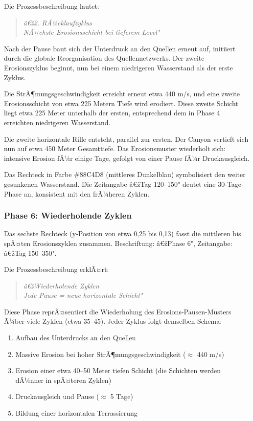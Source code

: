 Die Prozessbeschreibung lautet:
\begin{quote}
\textit{â€ž2. RÃ¼cklaufzyklus\\
NÃ¤chste Erosionsschicht bei tieferem Level"}
\end{quote}

Nach der Pause baut sich der Unterdruck an den Quellen erneut auf, initiiert durch die globale Reorganisation des Quellennetzwerks. Der zweite Erosionszyklus beginnt, nun bei einem niedrigeren Wasserstand als der erste Zyklus.

Die StrÃ¶mungsgeschwindigkeit erreicht erneut etwa 440 m/s, und eine zweite Erosionsschicht von etwa 225 Metern Tiefe wird erodiert. Diese zweite Schicht liegt etwa 225 Meter unterhalb der ersten, entsprechend dem in Phase 4 erreichten niedrigeren Wasserstand.

Die zweite horizontale Rille entsteht, parallel zur ersten. Der Canyon vertieft sich nun auf etwa 450 Meter Gesamttiefe. Das Erosionsmuster wiederholt sich: intensive Erosion fÃ¼r einige Tage, gefolgt von einer Pause fÃ¼r Druckausgleich.

Das Rechteck in Farbe \#88C4D8 (mittleres Dunkelblau) symbolisiert den weiter gesunkenen Wasserstand. Die Zeitangabe â€žTag 120--150" deutet eine 30-Tage-Phase an, konsistent mit den frÃ¼heren Zyklen.

\subsubsection*{Phase 6: Wiederholende Zyklen}

Das sechste Rechteck (y-Position von etwa 0,25 bis 0,13) fasst die mittleren bis spÃ¤ten Erosionszyklen zusammen. Beschriftung: â€žPhase 6", Zeitangabe: â€žTag 150--350".

Die Prozessbeschreibung erklÃ¤rt:
\begin{quote}
\textit{â€žWiederholende Zyklen\\
Jede Pause = neue horizontale Schicht"}
\end{quote}

Diese Phase reprÃ¤sentiert die Wiederholung des Erosions-Pausen-Musters Ã¼ber viele Zyklen (etwa 35--45). Jeder Zyklus folgt demselben Schema:
\begin{enumerate}
    \item Aufbau des Unterdrucks an den Quellen
    \item Massive Erosion bei hoher StrÃ¶mungsgeschwindigkeit ($\approx$ 440 m/s)
    \item Erosion einer etwa 40--50 Meter tiefen Schicht (die Schichten werden dÃ¼nner in spÃ¤teren Zyklen)
    \item Druckausgleich und Pause ($\approx$ 5 Tage)
    \item Bildung einer horizontalen Terrassierung
\end{enumerate}

